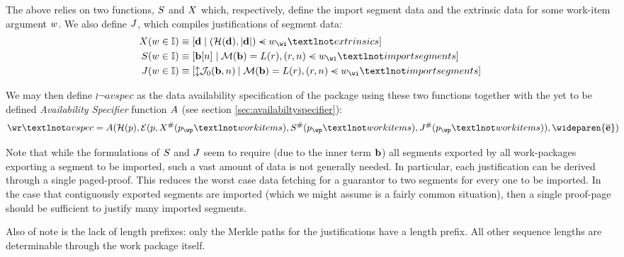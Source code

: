 The above relies on two functions, $S$ and $X$ which, respectively, define the import segment data and the extrinsic data for some work-item argument $w$. We also define $J$, which compiles justifications of segment data:
\begin{equation}
  \begin{aligned}
    \extrinsicdata(\wiX \in \mathbb{I}) &\equiv [\mathbf{d} \mid (\hash(\mathbf{d}), |\mathbf{d}|) \orderedin \wiX_\wi¬extrinsics] \\
    \importsegmentdata(\wiX \in \mathbb{I}) &\equiv [\segsX[n] \mid \mathcal{M}(\segsX) = \segrootlookup(r), (r, n) \orderedin \wiX_\wi¬importsegments] \\
    \justifysegmentdata(\wiX \in \mathbb{I}) &\equiv [\var{\mathcal{J}_0(\segsX, n)} \mid \mathcal{M}(\segsX) = \segrootlookup(r), (r, n) \orderedin \wiX_\wi¬importsegments]
  \end{aligned}
\end{equation}

We may then define $\wr¬avspec$ as the data availability specification of the package using these two functions together with the yet to be defined \emph{Availability Specifier} function $A$ (see section \ref{sec:availabiltyspecifier}):
\begin{equation}
  \wr¬avspec = \newavailabilityspecifier(
    \hash(\wpX),
    \se(
      \wpX,
      \extrinsicdata^\#(\wpX_\wp¬workitems),
      \importsegmentdata^\#(\wpX_\wp¬workitems),
      \justifysegmentdata^\#(\wpX_\wp¬workitems)
    ),
    \wideparen{\allexports}
  )\!\!\!\!
\end{equation}

Note that while the formulations of $S$ and $J$ seem to require (due to the inner term $\mathbf{b}$) all segments exported by all work-packages exporting a segment to be imported, such a vast amount of data is not generally needed. In particular, each justification can be derived through a single paged-proof. This reduces the worst case data fetching for a guarantor to two segments for every one to be imported. In the case that contiguously exported segments are imported (which we might assume is a fairly common situation), then a single proof-page should be sufficient to justify many imported segments.

Also of note is the lack of length prefixes: only the Merkle paths for the justifications have a length prefix. All other sequence lengths are determinable through the work package itself.

